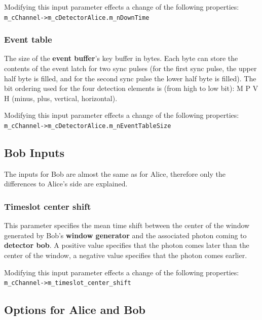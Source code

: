 Modifying this input parameter effects a change of the following properties\hyperlink{fn:modinfo}{\footnotemark[\value{fnmodinfo}]}:\\
\texttt{m\_cChannel->m\_cDetectorAlice.m\_nDownTime}

\subsubsection{Event table}
The size of the \textbf{event buffer}'s key buffer in bytes. Each byte can store the contents of the event latch for two sync pulses (for the first sync pulse, the upper half byte is filled, and for the second sync pulse the lower half byte is filled). The bit ordering used for the four detection elements is (from high to low bit): M P V H (minus, plus, vertical, horizontal). 

Modifying this input parameter effects a change of the following properties\hyperlink{fn:modinfo}{\footnotemark[\value{fnmodinfo}]}:\\
\texttt{m\_cChannel->m\_cDetectorAlice.m\_nEventTableSize}

\subsection{Bob Inputs}

The inputs for Bob are almost the same as for Alice, therefore only the differences to Alice's side are explained.

\subsubsection{Timeslot center shift}
This parameter specifies the mean time shift between the center of the window generated by Bob's \textbf{window generator} and the associated photon coming to \textbf{detector bob}. A positive value specifies that the photon comes later than the center of the window, a negative value specifies that the photon comes earlier.

Modifying this input parameter effects a change of the following properties\hyperlink{fn:modinfo}{\footnotemark[\value{fnmodinfo}]}:\\
\texttt{m\_cChannel->m\_timeslot\_center\_shift}

\subsection{Options for Alice and Bob}
\label{subsec:gui_abopt}

